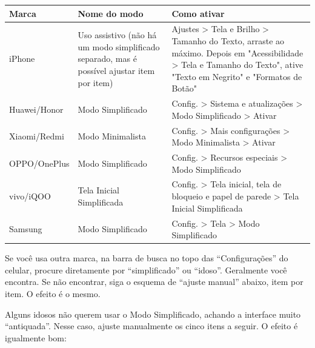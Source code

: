 
\begin{center}
\begin{tabularx}{\linewidth}{|X|X|X|}
\hline
\textbf{Marca} & \textbf{Nome do modo} & \textbf{Como ativar} \tabularnewline
\hline
iPhone & Uso assistivo (não há um modo simplificado separado, mas é possível ajustar item por item) & Ajustes > Tela e Brilho > Tamanho do Texto, arraste ao máximo. Depois em "Acessibilidade > Tela e Tamanho do Texto", ative "Texto em Negrito" e "Formatos de Botão" \tabularnewline
Huawei/Honor & Modo Simplificado & Config. > Sistema e atualizações > Modo Simplificado > Ativar \tabularnewline
Xiaomi/Redmi & Modo Minimalista & Config. > Mais configurações > Modo Minimalista > Ativar \tabularnewline
OPPO/OnePlus & Modo Simplificado & Config. > Recursos especiais > Modo Simplificado \tabularnewline
vivo/iQOO & Tela Inicial Simplificada & Config. > Tela inicial, tela de bloqueio e papel de parede > Tela Inicial Simplificada \tabularnewline
Samsung & Modo Simplificado & Config. > Tela > Modo Simplificado \tabularnewline
\hline
\end{tabularx}
\end{center}

Se você usa outra marca, na barra de busca no topo das “Configurações” do celular, procure diretamente por “simplificado” ou “idoso”. Geralmente você encontra. Se não encontrar, siga o esquema de “ajuste manual” abaixo, item por item. O efeito é o mesmo.


Alguns idosos não querem usar o Modo Simplificado, achando a interface muito “antiquada”. Nesse caso, ajuste manualmente os cinco itens a seguir. O efeito é igualmente bom:

